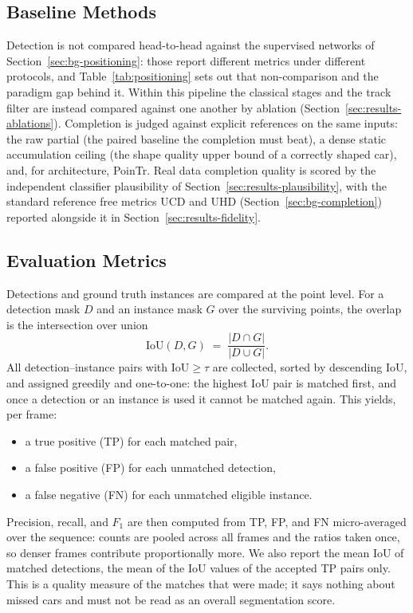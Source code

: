 \documentclass[a4paper,12pt]{report}
\begin{document}
\subsection{Baseline Methods}
\label{sec:eval-baselines}

Detection is not compared head-to-head against the supervised networks of
Section~\ref{sec:bg-positioning}: those report different metrics under different
protocols, and Table~\ref{tab:positioning} sets out that non-comparison and the
paradigm gap behind it. Within this pipeline the classical stages and the track
filter are instead compared against one another by ablation
(Section~\ref{sec:results-ablations}). Completion is judged against explicit
references on the same inputs: the raw partial (the paired baseline the
completion must beat), a dense static accumulation ceiling (the shape quality
upper bound of a correctly shaped car), and, for architecture, PoinTr. Real data
completion quality is scored by the independent classifier plausibility of
Section~\ref{sec:results-plausibility}, with the standard reference free metrics UCD and
UHD (Section~\ref{sec:bg-completion}) reported alongside it in
Section~\ref{sec:results-fidelity}.

\subsection{Evaluation Metrics}
\label{sec:eval-matching}

Detections and ground truth instances are compared at the point level.
For a detection mask $D$ and an instance mask $G$ over the surviving points, the
overlap is the intersection over union
\[
  \mathrm{IoU}(D,G) \;=\; \frac{|D \cap G|}{|D \cup G|}.
\]
All detection--instance pairs with $\mathrm{IoU} \geq \tau$ are collected, sorted
by descending IoU, and assigned greedily and one-to-one: the highest IoU
pair is matched first, and once a detection or an instance is used it cannot be
matched again. This yields, per frame:
\begin{itemize}
  \item a true positive (TP) for each matched pair,
  \item a false positive (FP) for each unmatched detection,
  \item a false negative (FN) for each unmatched eligible instance.
\end{itemize}
Precision, recall, and $F_1$ are then computed from TP, FP, and FN
micro-averaged over the sequence: counts are pooled across all frames and
the ratios taken once, so denser frames contribute proportionally more. We also
report the mean IoU of matched detections, the mean of the IoU values
of the accepted TP pairs only. This is a quality measure of the matches that were
made; it says nothing about missed cars and must not be read as an overall
segmentation score.
\end{document}
